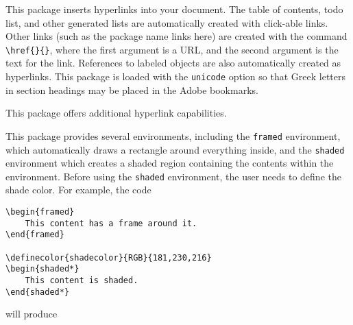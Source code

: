 \documentclass[letterpaper,12pt]{article}
\begin{document}
\begin{description}[align=margin,labelsep=0pt,leftmargin=0pt,style=multiline,labelwidth=63pt]
{}
\item[\href{http://ctan.sharelatex.com/tex-archive/macros/latex/contrib/hyperref/doc/manual.pdf}{\texttt{hyperref}}] This package inserts hyperlinks into your document. The table of contents, todo list, and other generated lists are automatically created with click-able links. Other links (such as the package name links here) are created with the command \verb|\href{}{}|, where the first argument is a URL, and the second argument is the text for the link. References to labeled objects are also automatically created as hyperlinks. This package is loaded with the \texttt{unicode} option so that Greek letters in section headings may be placed in the Adobe bookmarks.


{}
\item[\href{http://ctan.math.utah.edu/ctan/tex-archive/macros/latex/contrib/cleveref/cleveref.pdf}{\texttt{cleveref}}] This package offers additional hyperlink capabilities.


{}
\item[\href{http://get-software.net/macros/latex/contrib/framed/framed.pdf}{\texttt{framed}}] This package provides several environments, including the \texttt{framed} environment, which automatically draws a rectangle around everything inside, and the \texttt{shaded} environment which creates a shaded region containing the contents within the environment. Before using the \texttt{shaded} environment, the user needs to define the shade color. For example, the code

\begin{Verbatim}[frame=single,gobble=0,fontsize=\small]
\begin{framed}
	This content has a frame around it.
\end{framed}

\definecolor{shadecolor}{RGB}{181,230,216}
\begin{shaded*}
	This content is shaded.
\end{shaded*}
\end{Verbatim}

will produce

\begin{shaded*}
\setlength{\fboxsep}{9pt}
\smallskip


\end{shaded*}
\end{description}
\end{document}
